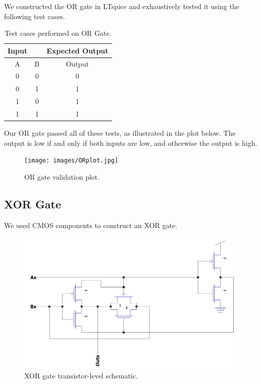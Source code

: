 \documentclass{article}
\begin{document}
We constructed the OR gate in LTspice and exhaustively tested it using the following test cases.
\begin{table}[H]
\begin{center}
 \begin{tabular}{|c c | c |} 
 \hline  
 Input &  & Expected Output \\
 \hline
 A & B & Output\\ 
 \hline
 0 & 0 & 0 \\ 
 \hline
 0 & 1 & 1 \\ 
 \hline
 1 & 0 & 1 \\ 
 \hline
 1 & 1 & 1 \\ 
 \hline
\end{tabular}
\end{center}
\begin{center}
\caption{Test cases performed on OR Gate.}
\end{center}
\end{table}
Our OR gate passed all of these tests, as illustrated in the plot below. The output is low if and only if both inputs are low, and otherwise the output is high. 
\begin{figure}[H]
  \begin{center}      
  \texttt{[image: images/ORplot.jpg]}
  \caption{OR gate validation plot.}   
  \label{fig:ORplot}
  \end{center}
\end{figure}


\subsection{XOR Gate}
We used CMOS components to construct an XOR gate.
\begin{figure}[H]
  \begin{center}      
  \includegraphics[scale = 0.5]{images/xorgate.PNG}
  \caption{XOR gate transistor-level schematic.}   
  \label{fig:exp1_schematic}
  \end{center}
\end{figure}
\end{document}
